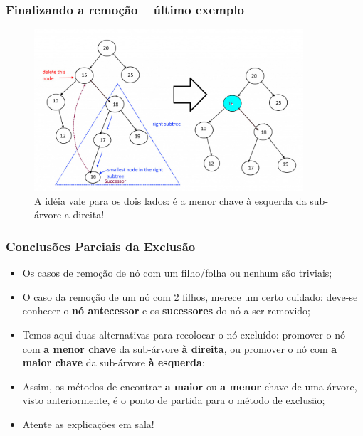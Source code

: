 \begin{frame}
\frametitle{Finalizando a remoção -- último exemplo}

   \begin{figure}[!ht]
    \centering
    \includegraphics[keepaspectratio=true,width=10cm]{figs/fig_arvores/ex03_Delete_NODE.jpg}
 \caption{A idéia vale para os dois lados: é a menor chave à esquerda  da sub-árvore a direita!}
    \end{figure}

\end{frame}

\begin{frame}

\frametitle{Conclusões Parciais da Exclusão}

\begin{block}{}
\begin{itemize}
  \item Os casos de remoção de nó com um filho/folha ou nenhum são triviais;
  \item O caso da remoção de um nó com 2 filhos, merece um certo cuidado:
  deve-se conhecer o \textbf{nó antecessor} e os \textbf{sucessores} do nó a ser removido;
  
  \item Temos aqui duas alternativas para recolocar o nó excluído: promover o nó com   \textbf{a menor chave} da sub-árvore \textbf{à direita}, ou   promover o nó com  \textbf{a maior chave} da 
  sub-árvore \textbf{à esquerda};
  
  \item Assim, os métodos de encontrar \textbf{a maior} ou \textbf{a menor}  chave de uma árvore,  visto   anteriormente, é o ponto de partida para o método  de exclusão;
  
  \item Atente as explicações em sala!
\end{itemize}
\end{block}

\end{frame}

